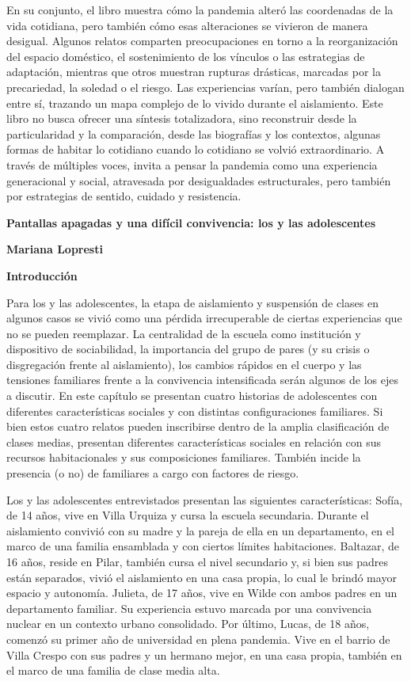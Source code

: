 En su conjunto, el libro muestra cómo la pandemia alteró las coordenadas de la vida cotidiana, pero también cómo esas alteraciones se vivieron de manera desigual. Algunos relatos comparten preocupaciones en torno a la reorganización del espacio doméstico, el sostenimiento de los vínculos o las estrategias de adaptación, mientras que otros muestran rupturas drásticas, marcadas por la precariedad, la soledad o el riesgo. Las experiencias varían, pero también dialogan entre sí, trazando un mapa complejo de lo vivido durante el aislamiento. Este libro no busca ofrecer una síntesis totalizadora, sino reconstruir desde la particularidad y la comparación, desde las biografías y los contextos, algunas formas de habitar lo cotidiano cuando lo cotidiano se volvió extraordinario. A través de múltiples voces, invita a pensar la pandemia como una experiencia generacional y social, atravesada por desigualdades estructurales, pero también por estrategias de sentido, cuidado y resistencia.

\textbf{\hfill\break
}

\textbf{Pantallas apagadas y una difícil convivencia: los y las adolescentes}

\textbf{Mariana Lopresti}

\textbf{Introducción}

Para los y las adolescentes, la etapa de aislamiento y suspensión de clases en algunos casos se vivió como una pérdida irrecuperable de ciertas experiencias que no se pueden reemplazar. La centralidad de la escuela como institución y dispositivo de sociabilidad, la importancia del grupo de pares (y su crisis o disgregación frente al aislamiento), los cambios rápidos en el cuerpo y las tensiones familiares frente a la convivencia intensificada serán algunos de los ejes a discutir. En este capítulo se presentan cuatro historias de adolescentes con diferentes características sociales y con distintas configuraciones familiares. Si bien estos cuatro relatos pueden inscribirse dentro de la amplia clasificación de clases medias, presentan diferentes características sociales en relación con sus recursos habitacionales y sus composiciones familiares. También incide la presencia (o no) de familiares a cargo con factores de riesgo.

Los y las adolescentes entrevistados presentan las siguientes características: Sofía, de 14 años, vive en Villa Urquiza y cursa la escuela secundaria. Durante el aislamiento convivió con su madre y la pareja de ella en un departamento, en el marco de una familia ensamblada y con ciertos límites habitaciones. Baltazar, de 16 años, reside en Pilar, también cursa el nivel secundario y, si bien sus padres están separados, vivió el aislamiento en una casa propia, lo cual le brindó mayor espacio y autonomía. Julieta, de 17 años, vive en Wilde con ambos padres en un departamento familiar. Su experiencia estuvo marcada por una convivencia nuclear en un contexto urbano consolidado. Por último, Lucas, de 18 años, comenzó su primer año de universidad en plena pandemia. Vive en el barrio de Villa Crespo con sus padres y un hermano mejor, en una casa propia, también en el marco de una familia de clase media alta.

